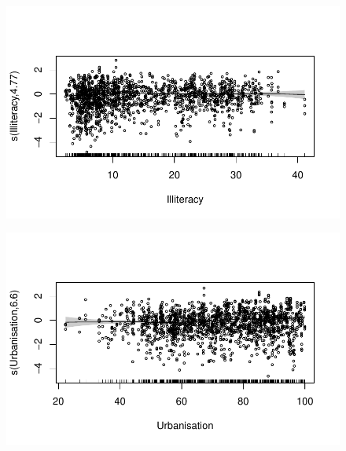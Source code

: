 \documentclass[
  letterpaper,
  DIV=11,
  numbers=noendperiod]{scrartcl}
\begin{document}
\begin{figure}[H]

{\centering \includegraphics{Group34Coursework_files/figure-pdf/unnamed-chunk-17-2.pdf}

}

\end{figure}

\begin{figure}[H]

{\centering \includegraphics{Group34Coursework_files/figure-pdf/unnamed-chunk-17-3.pdf}

}

\end{figure}
\end{document}
